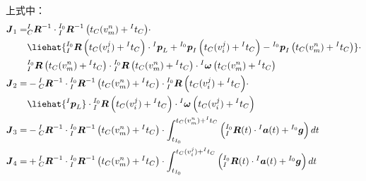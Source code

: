 上式中：
\begin{equation}
  \begin{aligned}
    \boldsymbol{J}_1= & {{^{I}_{C}}\boldsymbol{R}^{-1}}\cdot{{^{I_0}_{I}}\boldsymbol{R}^{-1}\left( t_{C}(v_m^n)+{^{I}t_C}\right) }\cdot
    \\&\liehat{{{^{I_0}_{I}}\boldsymbol{R}\left( t_{C}(v_i^j)+{^{I}t_C}\right)}
    \cdot{^{I}\boldsymbol{p}_L}+{^{I_0}\boldsymbol{p}_I\left( t_{C}(v_i^j)+{^{I}t_C}\right)}-{^{I_0}\boldsymbol{p}_I\left( t_{C}(v_m^n)+{^{I}t_C}\right)}}
    \cdot\\&{{^{I_0}_{I}}\boldsymbol{R}\left( t_{C}(v_m^n)+{^{I}t_C}\right) }\cdot {{^{I_0}_{I}}\boldsymbol{R}\left( t_{C}(v_m^n)+{^{I}t_C}\right) }
    \cdot{^{I}\boldsymbol{\omega}}\left( t_{C}(v_m^n)+{^{I}t_C}\right)
    \\
    \boldsymbol{J}_2= & -
    {{^{I}_{C}}\boldsymbol{R}^{-1}}\cdot{{^{I_0}_{I}}\boldsymbol{R}^{-1}\left( t_{C}(v_m^n)+{^{I}t_C}\right) }\cdot{{^{I_0}_{I}}\boldsymbol{R}\left( t_{C}(v_i^j)+{^{I}t_C}\right) }
    \cdot\\&\liehat{{^{I}\boldsymbol{p}_L}}
    \cdot{{^{I_0}_{I}}\boldsymbol{R}\left( t_{C}(v_i^j)+{^{I}t_C}\right) }
    \cdot{^{I}\boldsymbol{\omega}}\left( t_{C}(v_i^j)+{^{I}t_C}\right)
    \\
    \boldsymbol{J}_3= & -{{^{I}_{C}}\boldsymbol{R}^{-1}}
    \cdot{{^{I_0}_{I}}\boldsymbol{R}^{-1}\left( t_{C}(v_m^n)+{^{I}t_C}\right) }
    \cdot
    \int_{t_{I_0}}^{t_{C}(v_m^n)+{^{I}t_C}}\left( {^{I_0}_{I}\boldsymbol{R}}(t)\cdot{^{I}\boldsymbol{a}}(t)+{^{I_0}\boldsymbol{g}}\right)dt
    \\
    \boldsymbol{J}_4= & +
    {{^{I}_{C}}\boldsymbol{R}^{-1}}\cdot{{^{I_0}_{I}}\boldsymbol{R}^{-1}\left( t_{C}(v_m^n)+{^{I}t_C}\right) }
    \cdot
    \int_{t_{I_0}}^{t_{C}(v_i^j)+{^{I}t_C}}\left( {^{I_0}_{I}\boldsymbol{R}}(t)\cdot{^{I}\boldsymbol{a}}(t)+{^{I_0}\boldsymbol{g}}\right)dt
  \end{aligned}
\end{equation}

